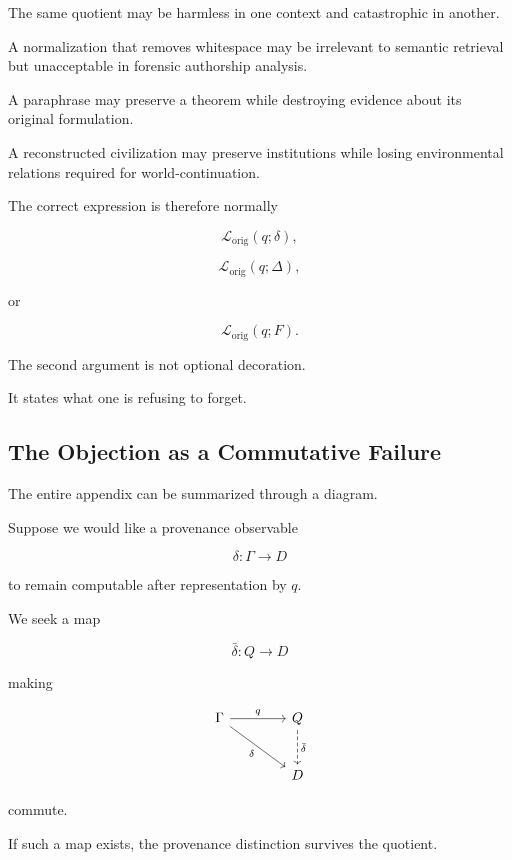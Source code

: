 \documentclass[
  11pt,
  a4paper,
  DIV=12,
  BCOR=0mm,
  parskip=half-
]{scrartcl}
\newcommand{\lossorig}{%
  \mathscr L_{\mathrm{orig}}%
}
\theoremstyle{definition}
\theoremstyle{plain}
\theoremstyle{remark}
\begin{document}
The same quotient may be harmless in one context and catastrophic in another.

A normalization that removes whitespace may be irrelevant to semantic
retrieval but unacceptable in forensic authorship analysis.

A paraphrase may preserve a theorem while destroying evidence about its
original formulation.

A reconstructed civilization may preserve institutions while losing
environmental relations required for world-continuation.

The correct expression is therefore normally

\[
  \lossorig(q;\delta),
\]

\[
  \lossorig(q;\Delta),
\]

or

\[
  \lossorig(q;F).
\]

The second argument is not optional decoration.

It states what one is refusing to forget.


\subsection{The Objection as a Commutative Failure}
\label{app:commutative-failure}

The entire appendix can be summarized through a diagram.

Suppose we would like a provenance observable

\[
  \delta:\Gamma\to D
\]

to remain computable after representation by \(q\).

We seek a map

\[
  \bar\delta:Q\to D
\]

making

\[
\begin{tikzcd}[column sep=4em,row sep=2.5em]
\Gamma \arrow[r,"q"] \arrow[dr,"\delta"'] &
Q \arrow[d,dashed,"\bar\delta"] \\
& D
\end{tikzcd}
\]

commute.

If such a map exists, the provenance distinction survives the quotient.
\end{document}
